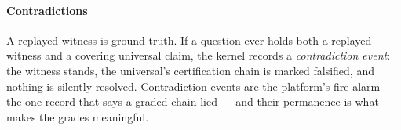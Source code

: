 \paragraph{Contradictions}
A replayed witness is ground truth. If a question ever holds both a
replayed witness and a covering universal claim, the kernel records
a \emph{contradiction event}: the witness stands, the universal's
certification chain is marked falsified, and nothing is silently
resolved. Contradiction events are the platform's fire alarm --- the
one record that says a graded chain lied --- and their permanence is
what makes the grades meaningful.
